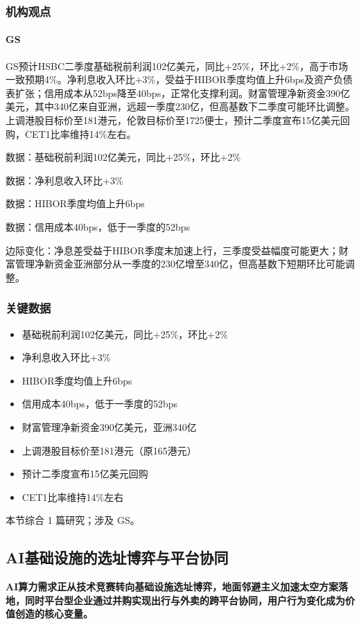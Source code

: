 \documentclass[11pt]{ctexart}
\begin{document}
\subsubsection*{机构观点}
\paragraph{GS} GS预计HSBC二季度基础税前利润102亿美元，同比+25\%，环比+2\%，高于市场一致预期4\%。净利息收入环比+3\%，受益于HIBOR季度均值上升6bps及资产负债表扩张；信用成本从52bps降至40bps，正常化支撑利润。财富管理净新资金390亿美元，其中340亿来自亚洲，远超一季度230亿，但高基数下二季度可能环比调整。上调港股目标价至181港元，伦敦目标价至1725便士，预计二季度宣布15亿美元回购，CET1比率维持14\%左右。
{\small\color{refgray}数据：基础税前利润102亿美元，同比+25\%，环比+2\%\par}
{\small\color{refgray}数据：净利息收入环比+3\%\par}
{\small\color{refgray}数据：HIBOR季度均值上升6bps\par}
{\small\color{refgray}数据：信用成本40bps，低于一季度的52bps\par}
{\small\color{refgray}边际变化：净息差受益于HIBOR季度末加速上行，三季度受益幅度可能更大；财富管理净新资金亚洲部分从一季度的230亿增至340亿，但高基数下短期环比可能调整。\par}
\subsubsection*{关键数据}
\begin{itemize}
  \item 基础税前利润102亿美元，同比+25\%，环比+2\%
  \item 净利息收入环比+3\%
  \item HIBOR季度均值上升6bps
  \item 信用成本40bps，低于一季度的52bps
  \item 财富管理净新资金390亿美元，亚洲340亿
  \item 上调港股目标价至181港元（原165港元）
  \item 预计二季度宣布15亿美元回购
  \item CET1比率维持14\%左右
\end{itemize}
{\small\color{refgray}本节综合 1 篇研究；涉及 GS。}
\newpage
\subsection{AI基础设施的选址博弈与平台协同}
\textbf{AI算力需求正从技术竞赛转向基础设施选址博弈，地面邻避主义加速太空方案落地，同时平台型企业通过并购实现出行与外卖的跨平台协同，用户行为变化成为价值创造的核心变量。}
\end{document}
